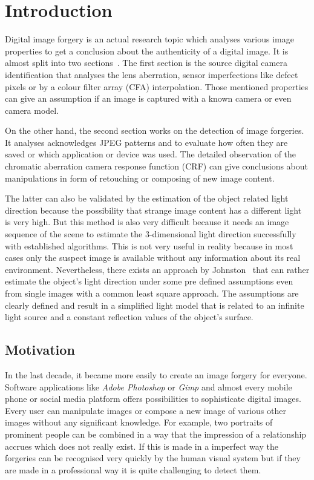 \section{Introduction}\label{sec:Introduction}
Digital image forgery is an actual research topic which analyses various image properties to get a conclusion about the authenticity of a digital image. It is almost split into two sections~\cite{4284575}. The first section is the source digital camera identification that analyses the lens aberration, sensor imperfections like defect pixels or by a colour filter array (CFA) interpolation. Those mentioned properties can give an assumption if an image is captured with a known camera or even camera model.

On the other hand, the second section works on the detection of image forgeries. It analyses acknowledges JPEG patterns and to evaluate how often they are saved or which application or device was used. The detailed observation of the chromatic aberration camera response function (CRF) can give conclusions about manipulations in form of retouching or composing of new image content. 

The latter can also be validated by the estimation of the object related light direction because the possibility that strange image content has a different light is very high. But this method is also very difficult because it needs an image sequence of the scene to estimate the 3-dimensional light direction successfully with established algorithms. This is not very useful in reality because in most cases only the suspect image is available without any information about its real environment. Nevertheless, there exists an approach by Johnston~\cite{Johnson} that can rather estimate the object's light direction under some pre defined assumptions even from single images with a common least square approach. The assumptions are clearly defined and result in a simplified light model that is related to an infinite light source and a constant reflection values of the object's surface.

\subsection{Motivation}\label{sec:Motivation}
In the last decade, it became more easily to create an image forgery for everyone. Software applications like \textit{Adobe Photoshop} or \textit{Gimp} and almost every mobile phone or social media platform offers possibilities to sophisticate digital images. Every user can manipulate images or compose a new image of various other images without any significant knowledge. For example, two portraits of prominent people can be combined in a way that the impression of a relationship accrues which does not really exist. If this is made in a imperfect way the forgeries can be recognised very quickly by the human visual system but if they are made in a professional way it is quite challenging to detect them. 

